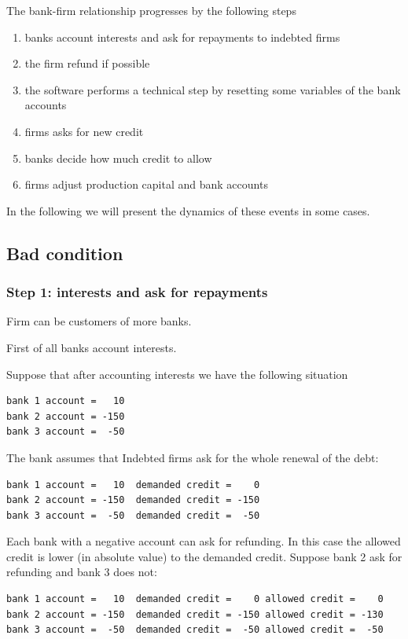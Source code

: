\documentclass{article}
\begin{document}
The bank-firm relationship progresses by the following steps

\begin{enumerate}
	\item banks account interests and ask for repayments to indebted firms
	\item the firm refund if possible
	\item the software performs a technical step by resetting some variables of the bank accounts
	\item firms asks for new credit
	\item banks decide how much credit to allow
	\item firms adjust production capital and bank accounts
\end{enumerate}
In the following we will present the dynamics of these events in some cases.

\subsection{Bad condition}
\subsubsection*{Step 1: interests and ask for repayments}
Firm can be customers of more banks.

First of all banks account interests.

Suppose that after accounting interests we have the following situation
\begin{verbatim}
bank 1 account =   10
bank 2 account = -150
bank 3 account =  -50
\end{verbatim}

The bank assumes that Indebted firms ask for the whole renewal of the debt:

\begin{verbatim}
bank 1 account =   10  demanded credit =    0
bank 2 account = -150  demanded credit = -150
bank 3 account =  -50  demanded credit =  -50
\end{verbatim}

Each bank with a negative account can ask for refunding. In this case the allowed credit is lower (in absolute value) to the demanded credit.
Suppose bank 2 ask for refunding and bank 3 does not:

\begin{verbatim}
bank 1 account =   10  demanded credit =    0 allowed credit =    0
bank 2 account = -150  demanded credit = -150 allowed credit = -130 
bank 3 account =  -50  demanded credit =  -50 allowed credit =  -50
\end{verbatim}
\end{document}
